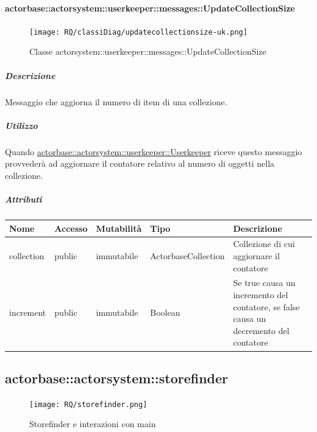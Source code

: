 \documentclass{scalatekids-article}
\begin{document}
\paragraph{actorbase::actorsystem::userkeeper::messages::UpdateCollectionSize}
\label{sec:actorbase::actorsystem::userkeeper::messages::UpdateCollectionSize}

\begin{figure}[H]
   \begin{center}
     \texttt{[image: RQ/classiDiag/updatecollectionsize-uk.png]}
     \caption{Classe actorsystem::userkeeper::messages::UpdateCollectionSize}
   \end{center}
 \end{figure}

\subparagraph{Descrizione}

Messaggio che aggiorna il numero di item di una collezione.

\subparagraph{Utilizzo}

Quando \hyperref[sec:actorbase::actorsystem::userkeeper::Userkeeper]{actorbase::\allowbreak{}actorsystem::\allowbreak{}userkeeper::\allowbreak{}Userkeeper}
riceve questo messaggio provvederà ad aggiornare il contatore relativo al numero di oggetti
nella collezione.

\subparagraph{Attributi}
\begin{tabular}{| p{3cm} | p{1.5cm} | p{2cm} | p{2cm} | p{8.5cm} |}
  \hline
  Nome & Accesso & Mutabilità & Tipo & Descrizione\\
  \hline
  collection & public & immutabile & ActorbaseCollection & Collezione di cui aggiornare il contatore \\
  \hline
  increment & public & immutabile & Boolean & Se true causa un incremento del contatore, se false causa un decremento del contatore \\
  \hline
\end{tabular}


\subsection{actorbase::actorsystem::storefinder}
\label{sec:actorbase::actorsystem::storefinder}

\begin{figure}[H]
  \begin{center}
    \texttt{[image: RQ/storefinder.png]}
    \caption{Storefinder e interazioni con main}
  \end{center}
\end{figure}
\end{document}
